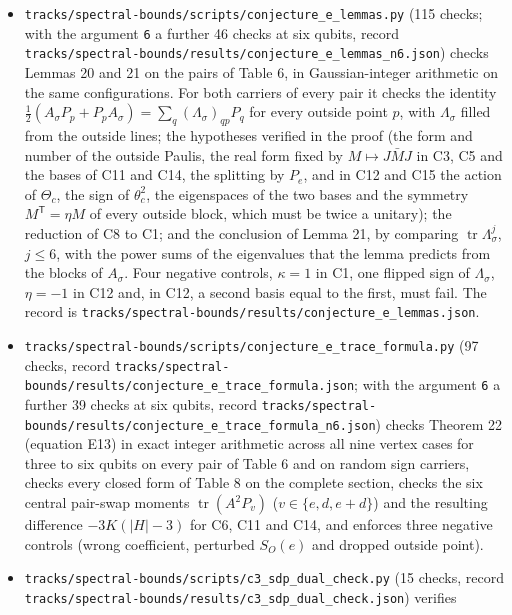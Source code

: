 \documentclass[11pt,a4paper]{article}
\begin{document}
\begin{itemize}
  \nolinkurl{tracks/spectral-bounds/results/conjecture_e.json}.
\item
  \nolinkurl{tracks/spectral-bounds/scripts/conjecture_e_lemmas.py} (115 checks; with the argument \texttt{6} a further 46 checks at six qubits,
  record \nolinkurl{tracks/spectral-bounds/results/conjecture_e_lemmas_n6.json}) checks Lemmas 20 and 21 on the pairs of Table 6, in
  Gaussian-integer arithmetic on the same configurations. For both carriers of every pair it checks the
  identity \(\frac12(A_\sigma P_p+P_pA_\sigma)=\sum_q(\Lambda_\sigma)_{qp}P_q\) for every outside point \(p\), with
  \(\Lambda_\sigma\) filled from the outside lines; the hypotheses verified in the proof (the form and number
  of the outside Paulis, the real form fixed by \(M\mapsto J\bar MJ\) in C3, C5 and the bases of C11 and
  C14, the splitting by \(P_e\), and in C12 and C15 the action of \(\Theta_c\), the sign of \(\theta_c^2\), the
  eigenspaces of the two bases and the symmetry \(M^{\mathsf T}=\eta M\) of every outside block, which must
  be twice a unitary); the reduction of C8 to C1; and the
  conclusion of Lemma 21, by comparing \(\operatorname{tr}\Lambda_\sigma^j\), \(j\le6\), with the power sums of
  the eigenvalues that the lemma predicts from the blocks of \(A_\sigma\). Four negative controls,
  \(\kappa=1\) in C1, one flipped sign of \(\Lambda_\sigma\), \(\eta=-1\) in C12 and, in C12, a second basis
  equal to the first, must fail. The record is
  \nolinkurl{tracks/spectral-bounds/results/conjecture_e_lemmas.json}.
\item
  \nolinkurl{tracks/spectral-bounds/scripts/conjecture_e_trace_formula.py} (97 checks, record \nolinkurl{tracks/spectral-bounds/results/conjecture_e_trace_formula.json};
  with the argument \texttt{6} a further 39 checks at six qubits, record \nolinkurl{tracks/spectral-bounds/results/conjecture_e_trace_formula_n6.json})
  checks Theorem 22 (equation E13) in exact integer arithmetic across all nine vertex cases for three to
  six qubits on every pair of Table 6 and on random sign carriers, checks every closed form of Table 8 on
  the complete section, checks the six central pair-swap moments \(\operatorname{tr}(A^2P_v)\)
  (\(v\in\{e,d,e+d\}\)) and the resulting difference \(-3K(|H|-3)\) for C6, C11 and C14, and enforces three
  negative controls (wrong coefficient, perturbed \(S_O(e)\) and dropped outside point).
\item
  \nolinkurl{tracks/spectral-bounds/scripts/c3_sdp_dual_check.py} (15 checks, record \nolinkurl{tracks/spectral-bounds/results/c3_sdp_dual_check.json}) verifies

\end{itemize}
\end{document}
